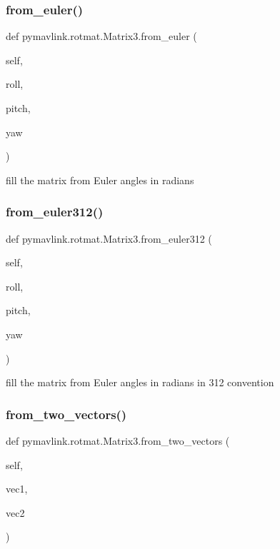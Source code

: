 \subsubsection{\texorpdfstring{from\+\_\+euler()}{from\_euler()}}
{\footnotesize\ttfamily def pymavlink.\+rotmat.\+Matrix3.\+from\+\_\+euler (\begin{DoxyParamCaption}\item[{}]{self,  }\item[{}]{roll,  }\item[{}]{pitch,  }\item[{}]{yaw }\end{DoxyParamCaption})}

\begin{DoxyVerb}fill the matrix from Euler angles in radians\end{DoxyVerb}
 \mbox{\label{classpymavlink_1_1rotmat_1_1Matrix3_a0b834f239462597a080898e9528839a7}} 
\subsubsection{\texorpdfstring{from\+\_\+euler312()}{from\_euler312()}}
{\footnotesize\ttfamily def pymavlink.\+rotmat.\+Matrix3.\+from\+\_\+euler312 (\begin{DoxyParamCaption}\item[{}]{self,  }\item[{}]{roll,  }\item[{}]{pitch,  }\item[{}]{yaw }\end{DoxyParamCaption})}

\begin{DoxyVerb}fill the matrix from Euler angles in radians in 312 convention\end{DoxyVerb}
 \mbox{\label{classpymavlink_1_1rotmat_1_1Matrix3_a2c4686d62f2d2bf82c4bbcce63e341f0}} 
\subsubsection{\texorpdfstring{from\+\_\+two\+\_\+vectors()}{from\_two\_vectors()}}
{\footnotesize\ttfamily def pymavlink.\+rotmat.\+Matrix3.\+from\+\_\+two\+\_\+vectors (\begin{DoxyParamCaption}\item[{}]{self,  }\item[{}]{vec1,  }\item[{}]{vec2 }\end{DoxyParamCaption})}

